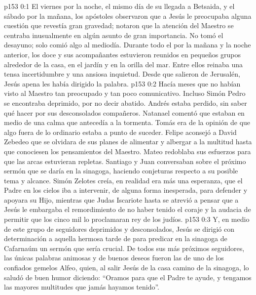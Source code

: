\author{Comisión de seres intermedios}
\vs p153 0:1 El viernes por la noche, el mismo día de su llegada a Betsaida, y el sábado por la mañana, los apóstoles observaron que a Jesús le preocupaba alguna cuestión que revestía gran gravedad; notaron que la atención del Maestro se centraba inusualmente en algún asunto de gran importancia. No tomó el desayuno; solo comió algo al mediodía. Durante todo el  por la mañana y la noche anterior, los doce y sus acompañantes estuvieron reunidos en pequeños grupos alrededor de la casa, en el jardín y en la orilla del mar. Entre ellos reinaba una tensa incertidumbre y una ansiosa inquietud. Desde que salieron de Jerusalén, Jesús apena les había dirigido la palabra.
\vs p153 0:2 Hacía meses que no habían visto al Maestro tan preocupado y tan poco comunicativo. Incluso Simón Pedro se encontraba deprimido, por no decir abatido. Andrés estaba perdido, sin saber qué hacer por sus desconsolados compañeros. Natanael comentó que estaban en medio de una calma que antecedía a la tormenta. Tomás era de la opinión de que algo fuera de lo ordinario estaba a punto de suceder. Felipe aconsejó a David Zebedeo que se olvidara de sus planes de alimentar y albergar a la multitud hasta que conociesen los pensamientos del Maestro. Mateo redoblaba sus esfuerzos para que las arcas estuvieran repletas. Santiago y Juan conversaban sobre el próximo sermón que se daría en la sinagoga, haciendo conjeturas respecto a su posible tema y alcance. Simón Zelotes creía, en realidad era más una esperanza, que el Padre en los cielos iba a intervenir, de alguna forma inesperada, para defender y apoyara su Hijo, mientras que Judas Iscariote hasta se atrevió a pensar que a Jesús le embargaba el remordimiento de no haber tenido el coraje y la audacia de permitir que los cinco mil lo proclamaran rey de los judíos.
\vs p153 0:3 Y, en medio de este grupo de seguidores deprimidos y desconsolados, Jesús se dirigió con determinación a aquella hermosa tarde de  para predicar en la sinagoga de Cafarnaúm un sermón que sería crucial. De todos sus más próximos seguidores, las únicas palabras animosas y de buenos deseos fueron las de uno de los confiados gemelos Alfeo, quien, al salir Jesús de la casa camino de la sinagoga, lo saludó de buen humor diciendo: “Oramos para que el Padre te ayude, y tengamos las mayores multitudes que jamás hayamos tenido”.
